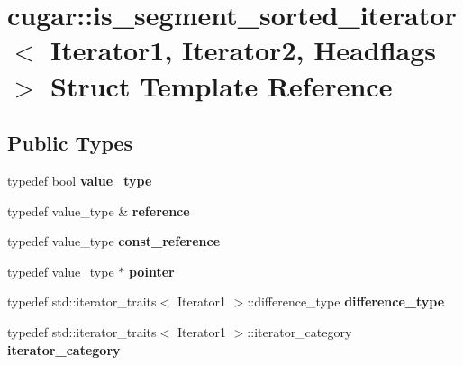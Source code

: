 \hypertarget{structcugar_1_1is__segment__sorted__iterator}{}\section{cugar\+:\+:is\+\_\+segment\+\_\+sorted\+\_\+iterator$<$ Iterator1, Iterator2, Headflags $>$ Struct Template Reference}
\label{structcugar_1_1is__segment__sorted__iterator}
\subsection*{Public Types}
\begin{DoxyCompactItemize}
\item 
\mbox{\label{structcugar_1_1is__segment__sorted__iterator_ae9837839e15dea819c4d3bab8cd62c35}} 
typedef bool {\bfseries value\+\_\+type}
\item 
\mbox{\label{structcugar_1_1is__segment__sorted__iterator_a4a20b9278f9fe1ac72896f2e949fbbc9}} 
typedef value\+\_\+type \& {\bfseries reference}
\item 
\mbox{\label{structcugar_1_1is__segment__sorted__iterator_a1d62618897f35c6525c8095b4230737a}} 
typedef value\+\_\+type {\bfseries const\+\_\+reference}
\item 
\mbox{\label{structcugar_1_1is__segment__sorted__iterator_a4840e5af4a0699f1e466cb2b54274851}} 
typedef value\+\_\+type $\ast$ {\bfseries pointer}
\item 
\mbox{\label{structcugar_1_1is__segment__sorted__iterator_ae1f4c8b1b38a5103f0d18c34a8361a66}} 
typedef std\+::iterator\+\_\+traits$<$ Iterator1 $>$\+::difference\+\_\+type {\bfseries difference\+\_\+type}
\item 
\mbox{\label{structcugar_1_1is__segment__sorted__iterator_a232b42f1d962f089524a6e1af753a6a8}} 
typedef std\+::iterator\+\_\+traits$<$ Iterator1 $>$\+::iterator\+\_\+category {\bfseries iterator\+\_\+category}
\end{DoxyCompactItemize}
